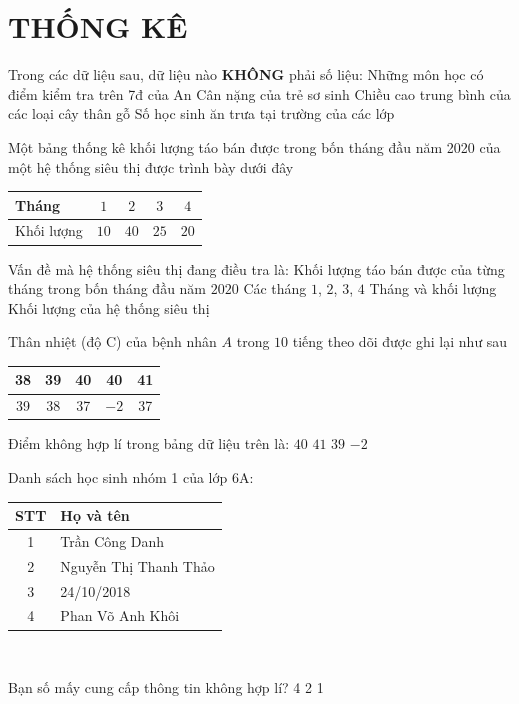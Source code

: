 \section{THỐNG KÊ}
\setcounter{ex}{0}

\begin{ex} Trong các dữ liệu sau, dữ liệu nào \textbf{KHÔNG} phải số liệu:
	\choice
	{\True Những môn học có điểm kiểm tra trên 7đ của An}
	{Cân nặng của trẻ sơ sinh}
	{Chiều cao trung bình của các loại cây thân gỗ}
	{Số học sinh ăn trưa tại trường của các lớp}
\end{ex}

\begin{ex}   
	Một bảng thống kê khối lượng táo bán được trong bốn tháng đầu năm 2020 của một hệ thống siêu thị được trình bày dưới đây
	\begin{center}
		\begin{tabular}{|l|c|c|c|c|}
			\hline Tháng & $1$ & $2$ & $3$ & $4$ \\
			\hline Khối lượng & $10$ & $40$ & $25$ & $20$ \\
			\hline
		\end{tabular}
	\end{center}
	Vấn đề mà hệ thống siêu thị đang điều tra là:
	\choice
	{\True Khối lượng táo bán được của từng tháng trong bốn tháng đầu năm $2020$}
	{Các tháng $1$, $2$, $3$, $4$}
	{Tháng và khối lượng}
	{Khối lượng của hệ thống siêu thị}
\end{ex}

\begin{ex}
	Thân nhiệt (độ C) của bệnh nhân $A$ trong $10$ tiếng theo dõi được ghi lại như sau
	\begin{center}
		\begin{tabular}{|c|c|c|c|c|}
			\hline
			38 & 39 & 40 & 40 & 41 \\
			\hline
			39 & 38 & 37 & $-2$ & 37 \\
			\hline
		\end{tabular}
	\end{center}
	Điểm không hợp lí trong bảng dữ liệu trên là:
	\choice
	{$40$}
	{$41$}
	{$39$}
	{\True $-2$}
\end{ex}

\begin{ex} Danh sách học sinh nhóm 1 của lớp 6A:
	\begin{center}
		\begin{tabular}{|c|l|}\hline
			\textbf{STT}&\textbf{Họ và tên}\\ \hline
			1&Trần Công Danh\\
			\hline
			2&Nguyễn Thị Thanh Thảo\\ \hline
			3&24/10/2018\\ \hline
			4&Phan Võ Anh Khôi\\ \hline
		\end{tabular}\\
	\end{center}
	Bạn số mấy cung cấp thông tin không hợp lí?
	\choice
	{4}
	{}
	{2}
	{1}
\end{ex}


